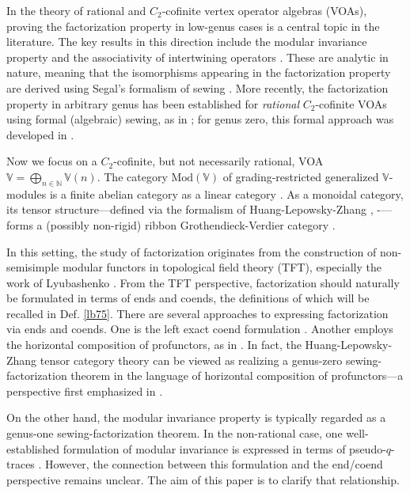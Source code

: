 \documentclass[11pt,b5paper,notitlepage]{article}
\theoremstyle{definition}
\theoremstyle{plain}
\newcommand{\Vbb}{\mathbb V}
\newcommand{\Nbb}{\mathbb N}
\newcommand{\<}{\left\langle}
\renewcommand{\>}{\right\rangle}
\newcommand{\Mod}{\mathrm{Mod}}
\numberwithin{equation}{section}
\begin{document}
In the theory of rational and $C_2$-cofinite vertex operator algebras (VOAs), proving the factorization property in low-genus cases is a central topic in the literature. The key results in this direction include the modular invariance property \cite{Zhu-modular-invariance, Hua-differential-genus-1} and the associativity of intertwining operators \cite{Hua-tensor-4, Hua-differential-genus-0}. These are analytic in nature, meaning that the isomorphisms appearing in the factorization property are derived using Segal's formalism of sewing \cite{Segal-CFT1, Segal-CFT2}. More recently, the factorization property in arbitrary genus has been established for \textit{rational} $C_2$-cofinite VOAs using formal (algebraic) sewing, as in \cite{DGT2}; for genus zero, this formal approach was developed in \cite{NT-P1_conformal_blocks}.


Now we focus on a $C_2$-cofinite, but not necessarily rational, VOA $\Vbb=\bigoplus_{n\in\Nbb}\Vbb(n)$. The category $\Mod(\Vbb)$ of grading-restricted generalized $\Vbb$-modules is a finite abelian category as a linear category \cite{MNT10, Hua-projectivecover}. As a monoidal category, its tensor structure---defined via the formalism of Huang-Lepowsky-Zhang \cite{HLZ1}, \cite{HLZ2}-\cite{HLZ8}---forms a (possibly non-rigid) ribbon Grothendieck-Verdier category \cite{ALSW21}. 

In this setting, the study of factorization originates from the construction of non-semisimple modular functors in topological field theory (TFT), especially the work of Lyubashenko \cite{Lyu95-Invariants, Lyu96-Ribbon}. From the TFT perspective, factorization should naturally be formulated in terms of ends and coends, the definitions of which will be recalled in Def. \ref{lb75}. There are several approaches to expressing factorization via ends and coends. One is the left exact coend formulation \cite{Lyu95-Invariants, Lyu96-Ribbon,FS-coends-CFT}. Another employs the horizontal composition of profunctors, as in \cite{HR24-MF}. In fact, the Huang-Lepowsky-Zhang tensor category theory can be viewed as realizing a genus-zero sewing-factorization theorem in the language of horizontal composition of profunctors---a perspective first emphasized in \cite{Moriwaki22-CB}. 

On the other hand, the modular invariance property is typically regarded as a genus-one sewing-factorization theorem. In the non-rational case, one well-established formulation of modular invariance is expressed in terms of pseudo-$q$-traces \cite{Miy-modular-invariance,AN-pseudo-trace,Fio-genus-1,Hua-modular-C2}. However, the connection between this formulation and the end/coend perspective remains unclear. The aim of this paper is to clarify that relationship.
\end{document}
